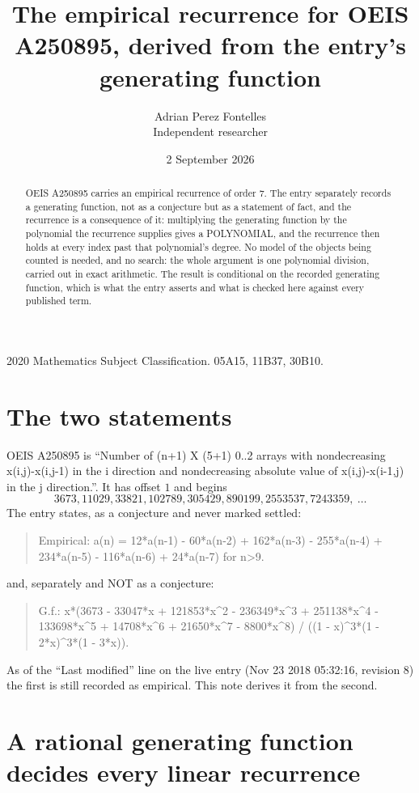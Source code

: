 \documentclass[11pt,a4paper]{article}
\title{The empirical recurrence for OEIS A250895, derived from the entry's generating function}
\author{Adrian Perez Fontelles\\ \small Independent researcher}
\date{2 September 2026}
\theoremstyle{plain}
\theoremstyle{definition}
\begin{document}
\maketitle

\begin{abstract}
OEIS A250895 carries an empirical recurrence of order $7$. The entry separately records a
generating function, not as a conjecture but as a statement of fact, and the recurrence is a
consequence of it: multiplying the generating function by the polynomial the recurrence
supplies gives a POLYNOMIAL, and the recurrence then holds at every index past that
polynomial's degree. No model of the objects being counted is needed, and no search: the
whole argument is one polynomial division, carried out in exact arithmetic. The result is
conditional on the recorded generating function, which is what the entry asserts and what is
checked here against every published term.
\end{abstract}

\noindent\small 2020 Mathematics Subject Classification. 05A15, 11B37, 30B10.\normalsize

\section{The two statements}

OEIS A250895 is ``Number of (n+1) X (5+1) 0..2 arrays with nondecreasing x(i,j)-x(i,j-1) in the i direction and nondecreasing absolute value of x(i,j)-x(i-1,j) in the j direction.''. It has offset $1$ and begins
\[
3673, 11029, 33821, 102789, 305429, 890199, 2553537, 7243359,\ \dots
\]
The entry states, as a conjecture and never marked settled:
\begin{quote}
Empirical: a(n) = 12*a(n-1) - 60*a(n-2) + 162*a(n-3) - 255*a(n-4) + 234*a(n-5) - 116*a(n-6) + 24*a(n-7) for n>9.
\end{quote}
and, separately and NOT as a conjecture:
\begin{quote}
G.f.: x*(3673 - 33047*x + 121853*x\^{}2 - 236349*x\^{}3 + 251138*x\^{}4 - 133698*x\^{}5 + 14708*x\^{}6 + 21650*x\^{}7 - 8800*x\^{}8) / ((1 - x)\^{}3*(1 - 2*x)\^{}3*(1 - 3*x)).
\end{quote}
As of the ``Last modified'' line on the live entry (Nov 23 2018 05:32:16, revision 8) the first is still
recorded as empirical. This note derives it from the second.

\section{A rational generating function decides every linear recurrence}
\end{document}
